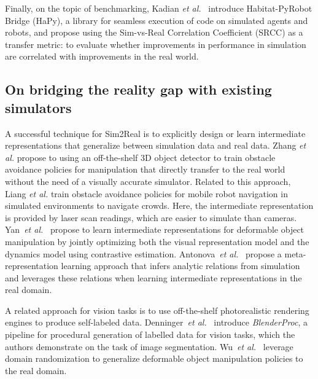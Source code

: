 Finally, on the topic of benchmarking, Kadian \emph{et al.}~\cite{Kadian:2020aa} introduce Habitat-PyRobot Bridge (HaPy), a library for seamless execution of code on simulated agents and robots, and propose using the Sim-vs-Real Correlation Coefficient (SRCC) as a transfer metric: to evaluate whether improvements in performance in simulation are correlated with improvements in the real world.



\subsection{On bridging the reality gap with existing simulators}
A successful technique for Sim2Real is to explicitly design or learn intermediate representations that generalize between simulation data and real data. Zhang \emph{et al.}\cite{Zhang:2020ab} propose to using an off-the-shelf 3D object detector to train obstacle avoidance policies for manipulation that directly transfer to the real world without the need of a visually accurate simulator. Related to this approach, Liang \emph{et al.}\cite{Liang:2020aa} train obstacle avoidance policies for mobile robot navigation in simulated environments to navigate crowds. Here, the intermediate representation is provided by laser scan readings, which are easier to simulate than cameras. Yan~\emph{et al.}~\cite{Yan:2020aa} propose to learn intermediate representations for deformable object manipulation by jointly optimizing both the visual representation model and the dynamics model using contrastive estimation. Antonova~\emph{et al.}~\cite{Antonova:2020ab} propose a meta-representation learning approach that infers analytic relations from simulation and leverages these relations when learning intermediate representations in the real domain.

A related approach for vision tasks is to use off-the-shelf photorealistic rendering engines to produce self-labeled data. 
Denninger~\emph{et al.}~\cite{Denninger:2020aa} introduce \textit{BlenderProc}, a pipeline for procedural generation of labelled data for vision tasks, which the authors demonstrate on the task of image segmentation.  Wu~\emph{et al.}~\cite{Wu:2020aa} leverage domain randomization to generalize deformable object manipulation policies to the real domain.

